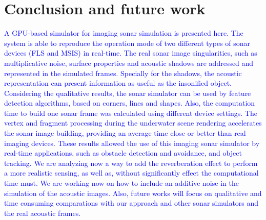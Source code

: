 \documentclass[final,5p,times]{elsarticle}
\begin{document}

\section{Conclusion and future work}
\label{conclusion}

\textcolor{blue}{A GPU-based simulator for imaging sonar simulation is presented here. The system is able to reproduce the operation mode of two different types of sonar devices (FLS and MSIS) in real-time. The real sonar image singularities, such as multiplicative noise, surface properties and acoustic shadows are addressed and represented in the simulated frames. Specially for the shadows, the acoustic representation can present information as useful as the insonified object. Considering the qualitative results, the sonar simulator can be used by feature detection algorithms, based on corners, lines and shapes. Also, the computation time to build one sonar frame was calculated using different device settings. The vertex and fragment processing during the underwater scene rendering accelerates the sonar image building, providing an average time close or better than real imaging devices. These results allowed the use of this imaging sonar simulator by real-time applications, such as obstacle detection and avoidance, and object tracking. We are analyzing now a way to add the reverberation effect to perform a more realistic sensing, as well as, without significantly effect the computational time must. We are working now on how to include an additive noise in the simulation of the acoustic images. Also, future works will focus on qualitative and time consuming comparations with our approach and other sonar simulators and the real acoustic frames.}











\end{document}
